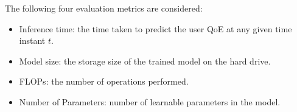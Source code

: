 The following four evaluation metrics are considered:
\begin{itemize}
    \item Inference time: the time taken to predict the user QoE at any given time instant $t$.
    \item Model size: the storage size of the trained model on the hard drive.
    \item FLOPs: the number of operations performed.
    \item Number of Parameters: number of learnable parameters in the model.
\end{itemize}
